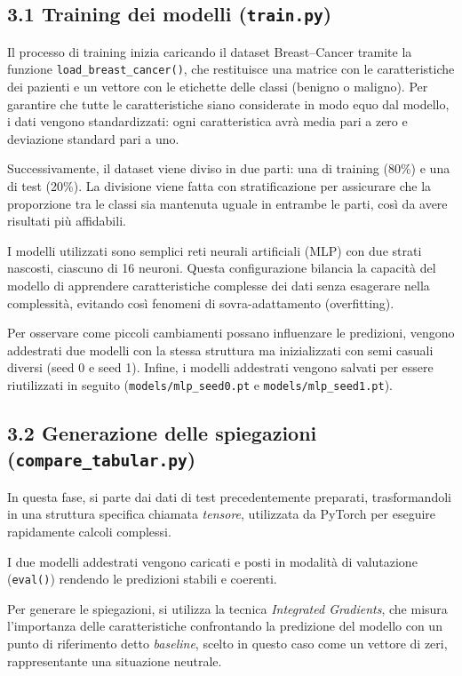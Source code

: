 \documentclass[a4paper,11pt]{article}
\begin{document}
\subsection*{3.1 Training dei modelli (\texttt{train.py})}
Il processo di training inizia caricando il dataset Breast–Cancer tramite la funzione \texttt{load\_breast\_cancer()}, che restituisce una matrice con le caratteristiche dei pazienti e un vettore con le etichette delle classi (benigno o maligno). Per garantire che tutte le caratteristiche siano considerate in modo equo dal modello, i dati vengono standardizzati: ogni caratteristica avrà media pari a zero e deviazione standard pari a uno.

Successivamente, il dataset viene diviso in due parti: una di training (80\%) e una di test (20\%). La divisione viene fatta con stratificazione per assicurare che la proporzione tra le classi sia mantenuta uguale in entrambe le parti, così da avere risultati più affidabili.

I modelli utilizzati sono semplici reti neurali artificiali (MLP) con due strati nascosti, ciascuno di 16 neuroni. Questa configurazione bilancia la capacità del modello di apprendere caratteristiche complesse dei dati senza esagerare nella complessità, evitando così fenomeni di sovra-adattamento (overfitting).

Per osservare come piccoli cambiamenti possano influenzare le predizioni, vengono addestrati due modelli con la stessa struttura ma inizializzati con semi casuali diversi (seed 0 e seed 1). Infine, i modelli addestrati vengono salvati per essere riutilizzati in seguito (\texttt{models/mlp\_seed0.pt} e \texttt{models/mlp\_seed1.pt}).

\subsection*{3.2 Generazione delle spiegazioni (\texttt{compare\_tabular.py})}

In questa fase, si parte dai dati di test precedentemente preparati, trasformandoli in una struttura specifica chiamata \emph{tensore}, utilizzata da PyTorch per eseguire rapidamente calcoli complessi.

I due modelli addestrati vengono caricati e posti in modalità di valutazione (\texttt{eval()}) rendendo le predizioni stabili e coerenti.

Per generare le spiegazioni, si utilizza la tecnica \emph{Integrated Gradients}, che misura l'importanza delle caratteristiche confrontando la predizione del modello con un punto di riferimento detto \emph{baseline}, scelto in questo caso come un vettore di zeri, rappresentante una situazione neutrale.
\end{document}
